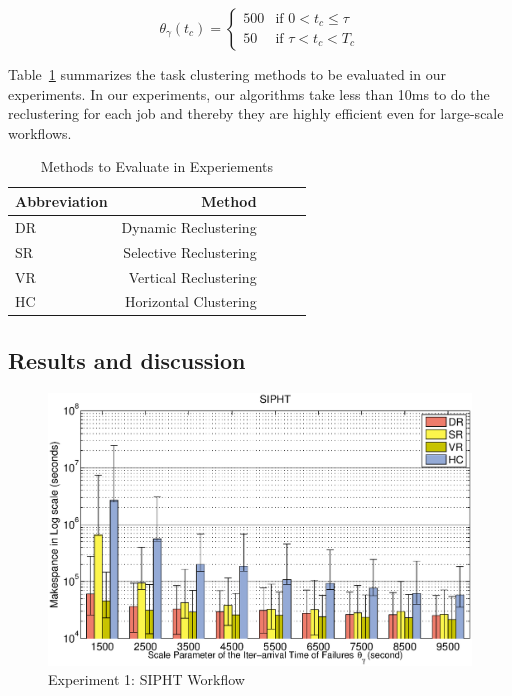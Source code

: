 \documentclass{IOS-Book-Article}
\begin{document}
\begin{equation}
\label{eq:pulse_function}
 \theta_{\gamma}(t_c) =
  \begin{cases}
   500 & \text{if } 0< t_c \leq \tau \\
   50       & \text{if } \tau< t_c < T_c
  \end{cases}
\end{equation}

Table~\ref{tab:evaluation_methods} summarizes the task clustering methods to be evaluated in our experiments. In our experiments, our algorithms take less than 10ms to do the reclustering for each job and thereby they are highly efficient even for large-scale workflows. 
\begin{table}[!htb]
	\centering
	\small
	\begin{tabular}{l|rrrr}
		\hline
		Abbreviation	& Method	  \\
		\hline
		DR 		& Dynamic Reclustering		\\
		SR 		&Selective Reclustering\\
		VR 	&Vertical Reclustering\\
		HC 	&Horizontal Clustering \\
		\hline
	\end{tabular}
	\caption{Methods to Evaluate in Experiements}
	\label{tab:evaluation_methods}
\end{table} 


\subsection{Results and discussion}
\label{sec:results}

\begin{figure}[!htb]
\centering
  \includegraphics[width=1\linewidth]{sipht.eps}
  \caption{Experiment 1: SIPHT Workflow}
  \label{fig:expr_sipht}
\end{figure}
\end{document}
